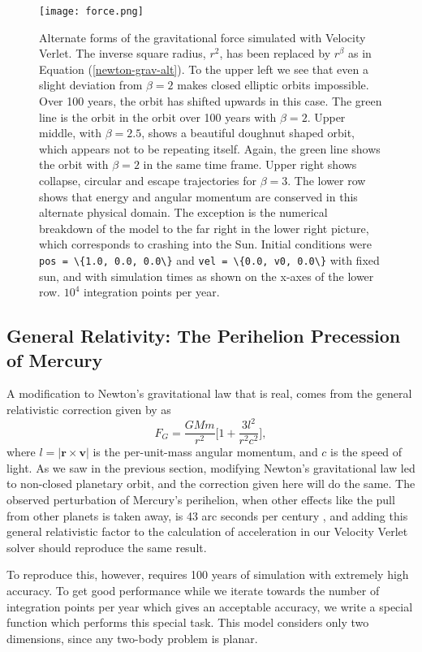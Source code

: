 \documentclass[]{article}
\begin{document}
\begin{figure}[!htb]
	\centering
	\texttt{[image: force.png]}
	\caption{Alternate forms of the gravitational force simulated with Velocity Verlet. The inverse square radius, $r^2$, has been replaced by $r^{\beta}$ as in Equation (\ref{newton-grav-alt}). To the upper left we see that even a slight deviation from $\beta=2$ makes closed elliptic orbits impossible. Over 100 years, the orbit has shifted upwards in this case. The green line is the orbit in the orbit over 100 years with $\beta=2$. Upper middle, with $\beta=2.5$, shows a beautiful doughnut shaped orbit, which appears not to be repeating itself. Again, the green line shows the orbit with $\beta=2$ in the same time frame. Upper right shows collapse, circular and escape trajectories for $\beta = 3$. The lower row shows that energy and angular momentum are conserved in this alternate physical domain. The exception is the numerical breakdown of the model to the far right in the lower right picture, which corresponds to crashing into the Sun. Initial conditions were \lstinline|pos = \{1.0, 0.0, 0.0\}| and \lstinline|vel = \{0.0, v0, 0.0\}| with fixed sun, and with simulation times as shown on the x-axes of the lower row. $10^4$ integration points per year.}
	\label{fig:force}
\end{figure}

\subsection{General Relativity: The Perihelion Precession of Mercury}
A modification to Newton's gravitational law that is real, comes from the general relativistic correction given by \cite{fys4150-p3} as
\begin{equation} \label{newton-rel}
	F_G = \frac{GMm}{r^2} \bigg[1 + \frac{3l^2}{r^2c^2}\bigg],
\end{equation}
where $l = |\mathbf{r} \times \mathbf{v}|$ is the per-unit-mass angular momentum, and $c$ is the speed of light. As we saw in the previous section, modifying Newton's gravitational law led to non-closed planetary orbit, and the correction given here will do the same. The observed perturbation of Mercury's perihelion, when other effects like the pull from other planets is taken away, is 43 arc seconds per century \cite{fys4150-p3}, and adding this general relativistic factor to the calculation of acceleration in our Velocity Verlet solver should reproduce the same result.

To reproduce this, however, requires 100 years of simulation with extremely high accuracy. To get good performance while we iterate towards the number of integration points per year which gives an acceptable accuracy, we write a special function which performs this special task. This model considers only two dimensions, since any two-body problem is planar.
\end{document}
